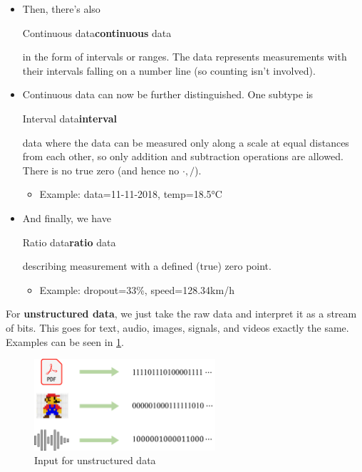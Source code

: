 \begin{itemize}
  \item Then, there's also \begin{sidenote}{Continuous data}\textbf{continuous} data\end{sidenote} in the form of intervals or ranges. The data represents measurements with their intervals falling on a number line (so counting isn't involved).
  
  \item Continuous data can now be further distinguished. One subtype is \begin{sidenote}{Interval data}\textbf{interval}\end{sidenote} data where the data can be measured only along a scale at equal distances from each other, so only addition and subtraction operations are allowed. There is no true zero (and hence no $\cdot, /$).
  \begin{itemize}
    \item {\footnotesize\color{ForestGreen}Example: data=11-11-2018, temp=18.5°C}
  \end{itemize}
  
  \item And finally, we have \begin{sidenote}{Ratio data}\textbf{ratio} data\end{sidenote} describing measurement with a defined (true) zero point.
  \begin{itemize}
    \item {\footnotesize\color{ForestGreen}Example: dropout=33\%, speed=128.34km/h}
  \end{itemize}
\end{itemize}

For \textbf{unstructured data}, we just take the raw data and interpret it as a stream of bits. This goes for text, audio, images, signals, and videos exactly the same. Examples can be seen in \ref{fig:1_unstructured_data}.

\begin{figure}[H]
  \centering
  \includegraphics[width=0.6\textwidth]{assets/basics/unstructured_data.png}
  \caption{Input for unstructured data}
  \label{fig:1_unstructured_data}
\end{figure}

